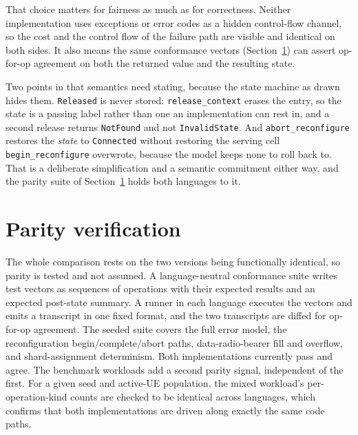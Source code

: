 \documentclass[english,oneside,a4paper,censored,csm,software-track-2020]{HYthesisML}
\begin{document}
That choice matters for fairness as much as for correctness. Neither implementation uses
exceptions or error codes as a hidden control-flow channel, so the cost and the control flow of
the failure path are visible and identical on both sides. It also means the same conformance
vectors (Section~\ref{sec:parity}) can assert op-for-op agreement on both the returned value and
the resulting state.

Two points in that semantics need stating, because the state machine as drawn hides them.
\texttt{Released} is never stored: \texttt{release\_context} erases the entry, so the state is a
passing label rather than one an implementation can rest in, and a second release returns
\texttt{NotFound} and not \texttt{InvalidState}. And \texttt{abort\_reconfigure} restores the
\emph{state} to \texttt{Connected} without restoring the serving cell
\texttt{begin\_reconfigure} overwrote, because the model keeps none to roll back to. That is a
deliberate simplification and a semantic commitment either way, and the parity suite of
Section~\ref{sec:parity} holds both languages to it.

\section{Parity verification}
\label{sec:parity}
The whole comparison rests on the two versions being functionally identical, so parity
is tested and not assumed. A language-neutral conformance suite writes test vectors as
sequences of operations with their expected results and an expected post-state summary. A
runner in each language executes the vectors and emits a transcript in one fixed format, and the
two transcripts are diffed for op-for-op agreement. The seeded suite covers the full error model,
the reconfiguration begin/complete/abort paths, data-radio-bearer fill and overflow, and
shard-assignment determinism. Both implementations currently pass and agree. The benchmark
workloads add a second parity signal, independent of the first. For a given seed and active-UE
population, the mixed workload's per-operation-kind counts are checked to be identical across
languages, which confirms that both implementations are driven along exactly the same code paths.
\end{document}
